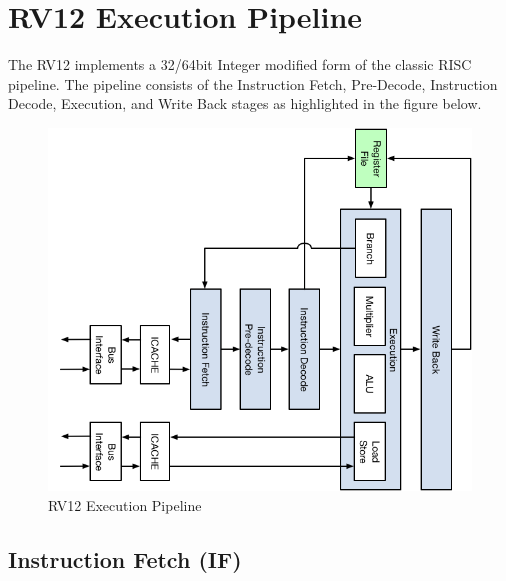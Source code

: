 \chapter{RV12 Execution Pipeline}

The RV12 implements a 32/64bit Integer modified form of the classic RISC pipeline. 
The pipeline consists of the Instruction Fetch, Pre-Decode, Instruction Decode, Execution, and Write Back stages as highlighted in the figure below.
 

\begin{figure}[h]
  \includegraphics{assets/img/Pipeline-Overview}
  \caption{RV12 Execution Pipeline}
\end{figure}

\pagebreak

\section{Instruction Fetch (IF)}\label{instruction-fetch-if}


